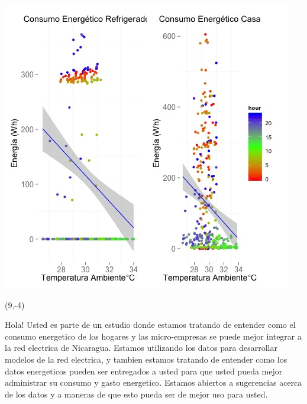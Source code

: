 \documentclass{article}\usepackage[]{graphicx}\usepackage[]{color}
\newenvironment{knitrout}{}{} %
\begin{document}
\begin{knitrout}
\color{fgcolor}
\includegraphics[scale=0.75]{figure/A4_correlaciones} 
\end{knitrout}

 \begin{textblock}{1}(9,-4)
\begin{minipage}{20em}
\begingroup

\endgroup
\end{minipage}
\end{textblock}

\vspace{70px}
\begin{knitrout}
Hola! Usted es parte de un estudio donde estamos tratando de entender como el consumo energetico de los hogares y las micro-empresas se puede mejor integrar a la red electrica de Nicaragua. Estamos utilizando los datos para desarrollar modelos de la red electrica, y tambien estamos tratando de entender como los datos energeticos pueden ser entregados a usted para que usted pueda mejor administrar su consumo y gasto energetico.  Estamos abiertos a sugerencias acerca de los datos y a maneras de que esto pueda ser de mejor uso para usted.
\end{knitrout}
\end{document}
